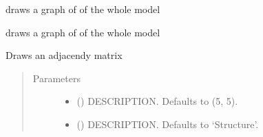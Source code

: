\documentclass[letterpaper,10pt,english]{sphinxmanual}
\begin{document}
\begin{fulllineitems}
\begin{fulllineitems}
\label{\detokenize{core/modelclass:modelclass.Graph_Draw_Mixin.drawendo_lag_lead}}
\pysigstartsignatures
{}
\pysigstopsignatures
\sphinxAtStartPar
draws a graph of of the whole model

\end{fulllineitems}


\begin{fulllineitems}
\label{\detokenize{core/modelclass:modelclass.Graph_Draw_Mixin.drawmodel}}
\pysigstartsignatures
{}
\pysigstopsignatures
\sphinxAtStartPar
draws a graph of of the whole model

\end{fulllineitems}


\begin{fulllineitems}
\label{\detokenize{core/modelclass:modelclass.Graph_Draw_Mixin.plotadjacency}}
\pysigstartsignatures
{}
\pysigstopsignatures
\sphinxAtStartPar
Draws an adjacendy matrix
\begin{quote}\begin{description}
\item[{Parameters}] \leavevmode\begin{itemize}
\item {} 
\sphinxAtStartPar
{} (\sphinxstyleliteralemphasis{\sphinxupquote{, }}) \textendash{} DESCRIPTION. Defaults to (5, 5).

\item {} 
\sphinxAtStartPar
{} (\sphinxstyleliteralemphasis{\sphinxupquote{, }}) \textendash{} DESCRIPTION. Defaults to ‘Structure’.


\end{itemize}
\end{description}
\end{quote}
\end{fulllineitems}
\end{fulllineitems}
\end{document}
